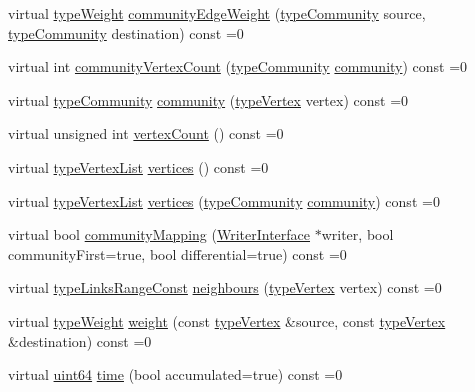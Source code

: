 \begin{DoxyCompactItemize}
virtual \hyperlink{edge_8h_a2e7ea3be891ac8b52f749ec73fee6dd2}{type\+Weight} \hyperlink{classDynCommBaseInterface_a17c322600ba39050005153845dfd3021}{community\+Edge\+Weight} (\hyperlink{graphUndirectedGroupable_8h_a914da95c9ea7f14f4b7f875c36818556}{type\+Community} source, \hyperlink{graphUndirectedGroupable_8h_a914da95c9ea7f14f4b7f875c36818556}{type\+Community} destination) const =0
\item 
virtual int \hyperlink{classDynCommBaseInterface_a2b4c4a130a2de5eb6cd79af88969ef3c}{community\+Vertex\+Count} (\hyperlink{graphUndirectedGroupable_8h_a914da95c9ea7f14f4b7f875c36818556}{type\+Community} \hyperlink{classDynCommBaseInterface_a9453a177580033aa1d4d9f165350ceba}{community}) const =0
\item 
virtual \hyperlink{graphUndirectedGroupable_8h_a914da95c9ea7f14f4b7f875c36818556}{type\+Community} \hyperlink{classDynCommBaseInterface_a9453a177580033aa1d4d9f165350ceba}{community} (\hyperlink{edge_8h_a5fbd20c46956d479cb10afc9855223f6}{type\+Vertex} vertex) const =0
\item 
virtual unsigned int \hyperlink{classDynCommBaseInterface_a792b9c74e55abbc48fbc078bc5fead0c}{vertex\+Count} () const =0
\item 
virtual \hyperlink{graphInterface_8h_a21d54d8a139def524d3b0d6f71ec4974}{type\+Vertex\+List} \hyperlink{classDynCommBaseInterface_af5023d7b81f4413cc8052df01067f71f}{vertices} () const =0
\item 
virtual \hyperlink{graphInterface_8h_a21d54d8a139def524d3b0d6f71ec4974}{type\+Vertex\+List} \hyperlink{classDynCommBaseInterface_ab178106e07cf3ad86ce2deb17dd5666e}{vertices} (\hyperlink{graphUndirectedGroupable_8h_a914da95c9ea7f14f4b7f875c36818556}{type\+Community} \hyperlink{classDynCommBaseInterface_a9453a177580033aa1d4d9f165350ceba}{community}) const =0
\item 
virtual bool \hyperlink{classDynCommBaseInterface_a0985625f987f7f428d76f3baac54e398}{community\+Mapping} (\hyperlink{classWriterInterface}{Writer\+Interface} $\ast$writer, bool community\+First=true, bool differential=true) const =0
\item 
virtual \hyperlink{graphInterface_8h_ae8d27008f15586bbf419af7ad2e0a48a}{type\+Links\+Range\+Const} \hyperlink{classDynCommBaseInterface_a9d6f5345d8cdf9e0d70b7a71bff8ade6}{neighbours} (\hyperlink{edge_8h_a5fbd20c46956d479cb10afc9855223f6}{type\+Vertex} vertex) const =0
\item 
virtual \hyperlink{edge_8h_a2e7ea3be891ac8b52f749ec73fee6dd2}{type\+Weight} \hyperlink{classDynCommBaseInterface_a31514affa49ac05ccf3318b3558cf0b2}{weight} (const \hyperlink{edge_8h_a5fbd20c46956d479cb10afc9855223f6}{type\+Vertex} \&source, const \hyperlink{edge_8h_a5fbd20c46956d479cb10afc9855223f6}{type\+Vertex} \&destination) const =0
\item 
virtual \hyperlink{systemDefines_8h_abc0f5bc07737e498f287334775dff2b6}{uint64} \hyperlink{classDynCommBaseInterface_a6fb483ffc71baf6f0d4f6a0371e34ca9}{time} (bool accumulated=true) const =0
\end{DoxyCompactItemize}



